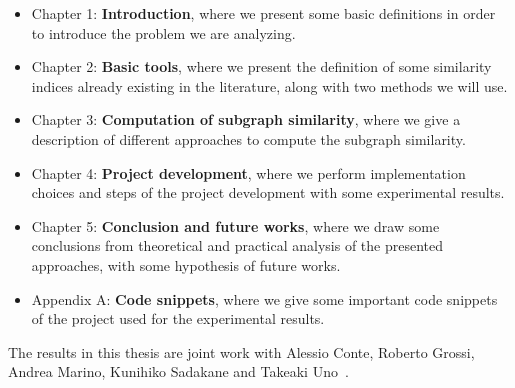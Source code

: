 \begin{itemize}
	\item Chapter 1: \textbf{Introduction},  where we present some basic definitions in order to introduce the problem we are analyzing.
	
	\item Chapter 2: \textbf{Basic tools}, where we present the definition of some similarity indices already existing in the literature, along with two methods we will use.
	
	\item Chapter 3: \textbf{Computation of subgraph similarity}, where we give a description of different approaches to compute the subgraph similarity.
	
	\item Chapter 4: \textbf{Project development}, where we perform implementation choices and steps of the project development with some experimental results.
	
	\item Chapter 5: \textbf{Conclusion and future works}, where we draw some conclusions from theoretical and practical analysis of the presented approaches, with some hypothesis of future works.
	
	\item Appendix A: \textbf{Code snippets}, where we give some important code snippets of the project used for the experimental results.
\end{itemize}

The results in this thesis are joint work with Alessio Conte, Roberto Grossi, Andrea Marino, Kunihiko Sadakane and Takeaki Uno~\cite{SubSim}.\medskip
